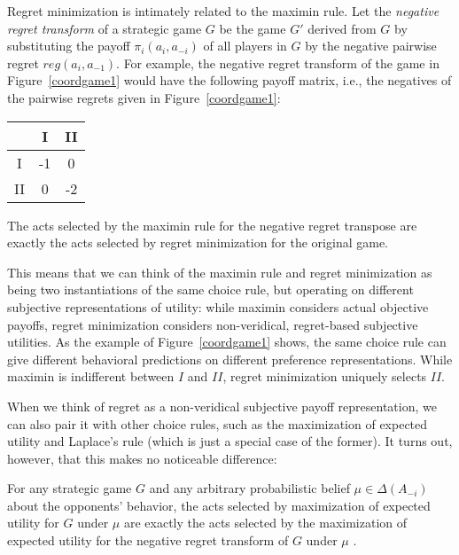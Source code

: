 \documentclass[fleqn,reqno,11pt]{article}
\begin{document}
Regret minimization is intimately related to the maximin rule. Let the \emph{negative regret
  transform} of a strategic game $G$ be the game $G'$ derived from $G$ by substituting the
payoff $\pi_i(a_i, a_{-i})$ of all players in $G$ by the negative pairwise regret
$reg(a_i,a_{-1})$. For example, the negative regret transform of the game in
Figure~\ref{coordgame1} would have the following payoff matrix, i.e., the negatives of the
pairwise regrets given in Figure~\ref{coordgame1}:

\begin{center}
    \begin{tabular}{ccc}
      \toprule
      & I & II \\
      \midrule
      I & -1 & 0 \\
      II & 0 & -2\\
      \bottomrule
    \end{tabular}
\end{center}

\noindent The acts selected by the maximin rule for the negative regret transpose are exactly
the acts selected by regret minimization for the original game.

This means that we can think of the maximin rule and regret minimization as being two
instantiations of the same choice rule, but operating on different subjective representations
of utility: while maximin considers actual objective payoffs, regret minimization considers
non-veridical, regret-based subjective utilities. As the example of Figure~\ref{coordgame1}
shows, the same choice rule can give different behavioral predictions on different preference
representations. While maximin is indifferent between $I$ and $II$, regret minimization
uniquely selects $II$.

When we think of regret as a non-veridical subjective payoff representation, we can also pair
it with other choice rules, such as the maximization of expected utility and Laplace's rule
(which is just a special case of the former). It turns out, however, that this makes no
noticeable difference: 

\begin{fact} \label{fact:maxEU-minReg} For any strategic game $G$ and any arbitrary
  probabilistic belief $\mu \in \Delta(A_{-i})$ about the opponents' behavior, the acts
  selected by maximization of expected utility for $G$ under $\mu$ are exactly the acts
  selected by the maximization of expected utility for the negative regret transform of $G$
  under $\mu$ \citep[e.g.][]{HalpernPass2012:Iterated-Regret}.
\end{fact}
\end{document}

